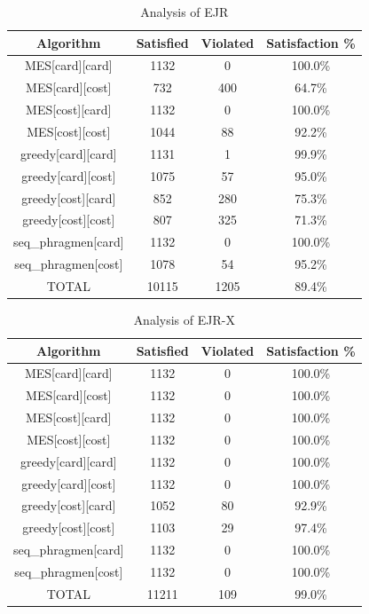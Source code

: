 

\begin{table}[h]
\centering
\begin{tabular}{cccc}
\toprule
Algorithm & Satisfied & Violated & Satisfaction \% \\
\midrule
MES[card][card] & 1132 & 0 & 100.0\% \\
MES[card][cost] & 732 & 400 & 64.7\% \\
MES[cost][card] & 1132 & 0 & 100.0\% \\
MES[cost][cost] & 1044 & 88 & 92.2\% \\
greedy[card][card] & 1131 & 1 & 99.9\% \\
greedy[card][cost] & 1075 & 57 & 95.0\% \\
greedy[cost][card] & 852 & 280 & 75.3\% \\
greedy[cost][cost] & 807 & 325 & 71.3\% \\
seq\_phragmen[card] & 1132 & 0 & 100.0\% \\
seq\_phragmen[cost] & 1078 & 54 & 95.2\% \\
TOTAL & 10115 & 1205 & 89.4\% \\
\bottomrule
\end{tabular}
\caption{Analysis of EJR}
\end{table}


\begin{table}[h]
\centering
\begin{tabular}{cccc}
\toprule
Algorithm & Satisfied & Violated & Satisfaction \% \\
\midrule
MES[card][card] & 1132 & 0 & 100.0\% \\
MES[card][cost] & 1132 & 0 & 100.0\% \\
MES[cost][card] & 1132 & 0 & 100.0\% \\
MES[cost][cost] & 1132 & 0 & 100.0\% \\
greedy[card][card] & 1132 & 0 & 100.0\% \\
greedy[card][cost] & 1132 & 0 & 100.0\% \\
greedy[cost][card] & 1052 & 80 & 92.9\% \\
greedy[cost][cost] & 1103 & 29 & 97.4\% \\
seq\_phragmen[card] & 1132 & 0 & 100.0\% \\
seq\_phragmen[cost] & 1132 & 0 & 100.0\% \\
TOTAL & 11211 & 109 & 99.0\% \\
\bottomrule
\end{tabular}
\caption{Analysis of EJR-X}
\end{table}


